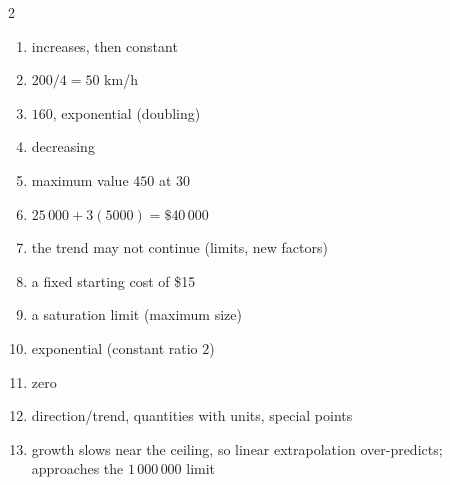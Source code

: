 \documentclass[11pt]{article}
\begin{document}
\begin{keybox}
\begin{multicols}{2}
\small
\begin{enumerate}[leftmargin=*,itemsep=3pt]
  \item increases, then constant
  \item $200/4=50$ km/h
  \item $160$, exponential (doubling)
  \item decreasing
  \item maximum value $450$ at $30$
  \item $25\,000+3(5000)=\$40\,000$
  \item the trend may not continue (limits, new factors)
  \item a fixed starting cost of \$15
  \item a saturation limit (maximum size)
  \item exponential (constant ratio $2$)
  \item zero
  \item direction/trend, quantities with units, special points
  \item growth slows near the ceiling, so linear extrapolation over-predicts; approaches the $1\,000\,000$ limit
\end{enumerate}
\end{multicols}
\end{keybox}
\end{document}
